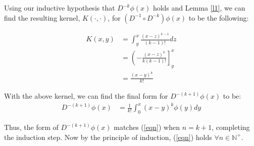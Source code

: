 \documentclass{article}[11pt]
\begin{document}
   Using our inductive hypothesis that $D^{-k}\phi(x)$ holds and Lemma \ref{l1}, we can find the resulting kernel, $K(\cdot,\cdot)$, for $(D^{-1} \circ D^{-k})\phi(x)$ to be the following:
   
   \begin{align*}
   K(x,y) &= \int_y^x \frac{(x-z)^{k-1}}{(k-1)!} dz \\
   &= \left( -\frac{(x-z)^{k}}{k(k-1)!} \right]_y^x \\
   &= \frac{(x-y)^{k}}{k!}
   \end{align*}
   
   With the above kernel, we can find the final form for $D^{-(k+1)}\phi(x)$ to be:
   \begin{align*}
   D^{-(k+1)}\phi(x) &= \frac{1}{k!}\int_0^x (x-y)^{k} \phi(y) dy
   \end{align*}
   
   Thus, the form of $D^{-(k+1)}\phi(x)$ matches (\ref{eqn}) when $n=k+1$, completing the induction step. Now by the principle of induction, (\ref{eqn}) holds $\forall n \in \mathbb{N}^{+}$.
   
\end{document}
